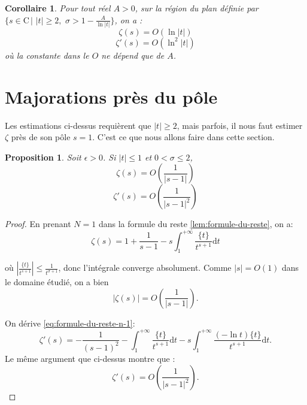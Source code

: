\documentclass[french]{report}
\newtheorem{proposition}[theorem]{Proposition}
\newtheorem{corollary}[theorem]{Corollaire}
\begin{document}
\begin{corollary}\label{cor:majoration-zeta-et-zeta-prime}
  Pour tout réel $A>0$, sur la région du plan définie par $\{s\in\mathrm{C}\,|\,\,|t|\geq2,\,\,\sigma>1-\frac{A}{\ln |t|}\}$, on a :
  \[ \zeta(s) = O(\ln |t|) \]
  \[ \zeta'(s) = O(\ln^2 |t|) \]
  où la constante dans le $O$ ne dépend que de $A$.
\end{corollary}

\section{Majorations près du pôle}

Les estimations ci-dessus requièrent que $|t|\geq2$, mais parfois, il nous faut estimer $\zeta$ près de son pôle $s=1$. C'est ce que nous allons faire dans cette section.

\begin{proposition}\label{prop:majorations-pres-du-pole}
  Soit $\epsilon>0$. Si $|t|\leq1$ et $0<\sigma\leq2$,
  \[ \zeta(s) = O\left(\frac{1}{|s-1|}\right) \]
  \[ \zeta'(s) = O\left(\frac{1}{|s-1|^2}\right) \]
\end{proposition}

\begin{proof}
  En prenant $N=1$ dans la formule du reste \ref{lem:formule-du-reste}, on a:
  \begin{equation}\label{eq:formule-du-reste-n-1}
    \zeta(s) = 1+\frac{1}{s-1}-s\int_1^{+\infty}\frac{\{t\}}{t^{s+1}}\mathrm{d}t
  \end{equation}

  où $\left|\frac{\{t\}}{t^{s+1}}\right|\leq\frac{1}{t^{\sigma+1}}$, donc l'intégrale converge absolument. Comme $|s|=O(1)$ dans le domaine étudié, on a bien
  \[ |\zeta(s)| = O\left(\frac{1}{|s-1|}\right). \]

  On dérive \ref{eq:formule-du-reste-n-1}:
  \[
    \zeta'(s)
    = -\frac{1}{(s-1)^2}
    - \int_1^{+\infty}\frac{\{t\}}{t^{s+1}}\mathrm{d}t
    - s\int_1^{+\infty}\frac{(-\ln t)\{t\}}{t^{s+1}}\mathrm{d}t.
  \]
  Le même argument que ci-dessus montre que :
  \[ \zeta'(s) = O\left(\frac{1}{|s-1|^2}\right). \]
\end{proof}
\end{document}
